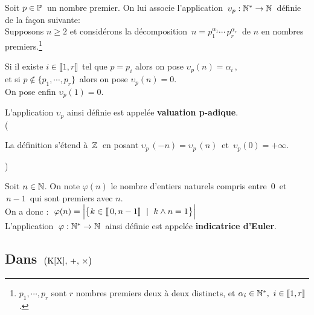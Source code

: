 \vspace{1.5cm}

\noindent Soit $p\in \mathbb{P}\,$ un nombre premier. On lui associe l'application \(\,\upsilon_p :\mathbb{N}^* \to \mathbb{N}\,\) définie de la façon suivante:\vspace{0.2cm}\\
Supposons $n\geq 2$ et considérons la décomposition \(\,n=p_1^{\alpha_1}\cdots\, p_r^{\alpha_r}\:\) de $n$ en nombres premiers.\footnote{$p_1,\cdots,p_r$ sont $r$ nombres premiers deux à deux distincts, et $\alpha_i\in \mathbb{N}^*,\ i\in \llbracket 1,r\rrbracket$.}\vspace{-0.2cm}
\begin{center}
Si il existe \(i\in \llbracket 1,r \rrbracket\,\) tel que $p=p_i$ alors on pose $\upsilon_p(n)=\alpha_i\,,$\vspace{0.1cm}\\
et si \(p\notin \{p_1,\cdots,p_r\}\,\) alors on pose $\upsilon_p(n)=0.$\vspace{0.1cm}\\
On pose enfin $\upsilon_p(1)=0.$
\end{center}
L'application $\upsilon_p$ ainsi définie est appelée \textbf{valuation p-adique}.\vspace{0.1cm}\\
(\begin{small}
    La définition s'étend à $\,\mathbb{Z}\,$ en posant $\upsilon_p\,(-n)=\upsilon_p\,(n)\,$ et $\,\upsilon_p(0)=+\infty$.
\end{small})

\vspace{1.5cm}

Soit $n\in \mathbb{N}$\expo{*}. On note $\varphi(n)$ le nombre d'entiers naturels compris entre $\,0\,$ et $\,n-1\,$ qui sont premiers avec $n$.\\
On a donc : \(\; \displaystyle \varphi(n)=\Bigl| \bigl\{k\in \llbracket \,0,n-1\rrbracket \ \mid \ k\land n =1\bigr\} \Bigr|\)\vspace{0.1cm}\\
L'application \(\:\varphi : \mathbb{N}^* \to \mathbb{N}\:\) ainsi définie est appelée \textbf{indicatrice d'Euler}.

\vspace{1.5cm}

\subsection{Dans $\,\bigl(\text{K}[\text{X}],\,+,\,\times \bigr)$}

